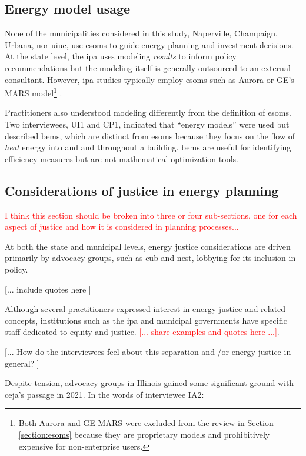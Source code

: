 \subsection{Energy model usage}

None of the municipalities considered in this study, Naperville, Champaign,
Urbana, nor \ac{uiuc}, use \acp{esom} to guide energy planning and investment
decisions. At the state level, the \ac{ipa} uses modeling \textit{results} to
inform policy recommendations but the modeling itself is generally outsourced to
an external consultant. However, \ac{ipa} studies typically employ \acp{esom}
such as Aurora or GE's MARS model\footnote{Both Aurora and GE MARS were excluded
from the review in Section \ref{section:esoms} because they are proprietary
models and prohibitively expensive for non-enterprise users.}
\cite{bringolf_evaluation_2024, carlson_illinois_2024}.

Practitioners also understood modeling differently from the definition of
\acp{esom}. Two interviewees, UI1 and CP1, indicated that ``energy models'' were
used but described \acp{bem}, which are distinct from \acp{esom} because they
focus on the flow of \textit{heat} energy into and and throughout a building.
\acp{bem} are useful for identifying efficiency measures but are not
mathematical optimization tools.


\subsection{Considerations of justice in energy planning}
\textcolor{red}{I think this section should be broken into three or four
sub-sections, one for each aspect of justice and how it is considered in
planning processes...}

At both the state and municipal levels, energy justice considerations are driven
primarily by advocacy groups, such as \ac{cub} and \ac{nest}, lobbying for its
inclusion in policy. 

[... include quotes here ]

Although several practitioners expressed interest in energy justice and related
concepts, institutions such as the \ac{ipa} and municipal governments have
specific staff dedicated to equity and justice. \textcolor{red}{[... share
examples and quotes here ...]}. 

[... How do the interviewees feel about this separation and /or energy justice
in general? ]

Despite tension, advocacy groups in Illinois gained some significant ground with
\ac{ceja}'s passage in 2021. In the words of interviewee IA2:

